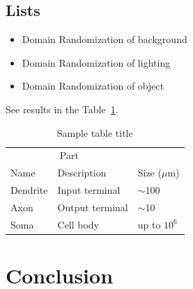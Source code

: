 \documentclass{article}
\begin{document}
\subsection{Lists}
\begin{itemize}
	\item Domain Randomization of background
	\item Domain Randomization of lighting
	\item Domain Randomization of object
\end{itemize}

See results in the Table~\ref{tab:table}.

\begin{table}
	\caption{Sample table title}
	\centering
	\begin{tabular}{lll}
		\toprule
		\multicolumn{2}{c}{Part}                   \\
		\cmidrule(r){1-2}
		Name     & Description     & Size ($\mu$m) \\
		\midrule
		Dendrite & Input terminal  & $\sim$100     \\
		Axon     & Output terminal & $\sim$10      \\
		Soma     & Cell body       & up to $10^6$  \\
		\bottomrule
	\end{tabular}
	\label{tab:table}
\end{table}

\section{Conclusion}
\label{sec:conclusion}
\lipsum[2]



\end{document}

